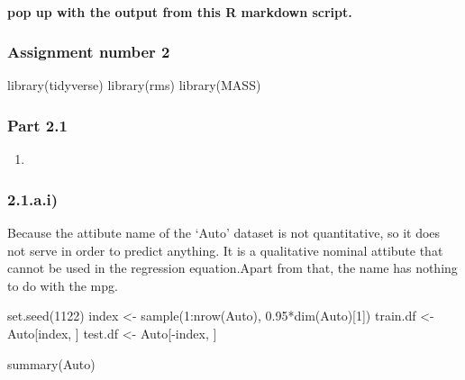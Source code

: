 \documentclass[
]{article}
\newenvironment{Shaded}{\begin{snugshade}}{\end{snugshade}}
\newcommand{\DecValTok}[1]{\textcolor[rgb]{0.00,0.00,0.81}{#1}}
\newcommand{\FloatTok}[1]{\textcolor[rgb]{0.00,0.00,0.81}{#1}}
\newcommand{\FunctionTok}[1]{\textcolor[rgb]{0.00,0.00,0.00}{#1}}
\newcommand{\NormalTok}[1]{#1}
\newcommand{\OtherTok}[1]{\textcolor[rgb]{0.56,0.35,0.01}{#1}}
\newcommand{\SpecialCharTok}[1]{\textcolor[rgb]{0.00,0.00,0.00}{#1}}
\providecommand{\tightlist}{%
  \setlength{\itemsep}{0pt}\setlength{\parskip}{0pt}}
\begin{document}
\hypertarget{pop-up-with-the-output-from-this-r-markdown-script.}{%
\paragraph{pop up with the output from this R markdown
script.}\label{pop-up-with-the-output-from-this-r-markdown-script.}}

\hypertarget{assignment-number-2}{%
\subsubsection{Assignment number 2}\label{assignment-number-2}}

\begin{Shaded}
\begin{Highlighting}[]

\FunctionTok{library}\NormalTok{(tidyverse)}
\FunctionTok{library}\NormalTok{(rms)}
\FunctionTok{library}\NormalTok{(MASS)}
\end{Highlighting}
\end{Shaded}

\hypertarget{part-2.1}{%
\subsubsection{Part 2.1}\label{part-2.1}}

\begin{enumerate}
\def\labelenumi{\alph{enumi})}
\tightlist
\item
\end{enumerate}

\hypertarget{a.i}{%
\subsubsection{2.1.a.i)}\label{a.i}}

Because the attibute name of the `Auto' dataset is not quantitative, so
it does not serve in order to predict anything. It is a qualitative
nominal attibute that cannot be used in the regression equation.Apart
from that, the name has nothing to do with the mpg.

\begin{Shaded}
\begin{Highlighting}[]
\FunctionTok{set.seed}\NormalTok{(}\DecValTok{1122}\NormalTok{)}
\NormalTok{index }\OtherTok{\textless{}{-}} \FunctionTok{sample}\NormalTok{(}\DecValTok{1}\SpecialCharTok{:}\FunctionTok{nrow}\NormalTok{(Auto), }\FloatTok{0.95}\SpecialCharTok{*}\FunctionTok{dim}\NormalTok{(Auto)[}\DecValTok{1}\NormalTok{])}
\NormalTok{train.df }\OtherTok{\textless{}{-}}\NormalTok{ Auto[index, ]}
\NormalTok{test.df }\OtherTok{\textless{}{-}}\NormalTok{ Auto[}\SpecialCharTok{{-}}\NormalTok{index, ]}

\FunctionTok{summary}\NormalTok{(Auto)}
\end{Highlighting}
\end{Shaded}
\end{document}
